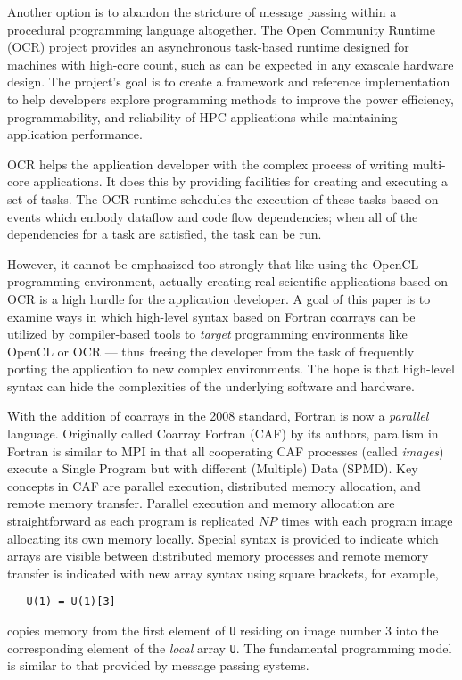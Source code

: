 Another option is to abandon the stricture of message passing within a procedural
programming language altogether.  The Open Community Runtime (OCR) project provides an
asynchronous task-based runtime designed for machines with high-core count, such as can be
expected in any exascale hardware design\cite{OCR:SC:2012}.  The project's goal is to
create a framework and reference implementation to help developers explore programming
methods to improve the power efficiency, programmability, and reliability of HPC
applications while maintaining application performance.

OCR helps the application developer with the complex process of writing multi-core
applications.  It does this by providing facilities for creating and executing a set of
tasks.  The OCR runtime schedules the execution of these tasks based on events which
embody dataflow and code flow dependencies; when all of the dependencies for a task are
satisfied, the task can be run.

However, it cannot be emphasized too strongly that like using the OpenCL programming
environment, actually creating real scientific applications based on OCR is a high hurdle
for the application developer.  A goal of this paper is to examine ways in
which high-level syntax based on Fortran coarrays can be utilized by compiler-based tools
to \emph{target} programming environments like OpenCL or OCR --- thus freeing the developer from
the task of frequently porting the application to new complex environments.  The hope is
that high-level syntax can hide the complexities of the underlying software and hardware.

With the addition of coarrays in the 2008 standard, Fortran is now a \emph{parallel}
language.  Originally called Coarray Fortran (CAF) by its
authors\cite{Numrich:1998:CFP:289918.289920}, parallism in Fortran is similar to MPI in
that all cooperating CAF processes (called \emph{images}) execute a Single Program but with
different (Multiple) Data (SPMD).  Key concepts in CAF are parallel execution, distributed
memory allocation, and remote memory transfer.  Parallel execution and memory allocation
are straightforward as each program is replicated $NP$ times with each program image
allocating its own memory locally.  Special syntax is provided to indicate which arrays
are visible between distributed memory processes and remote memory transfer is indicated
with new array syntax using square brackets, for example,
\begin{verbatim}
   U(1) = U(1)[3]
\end{verbatim}
copies memory from the first element of \texttt{U} residing on image number 3 into
the corresponding element of the \emph{local} array \texttt{U}.  The fundamental programming
model is similar to that provided by message passing systems.

